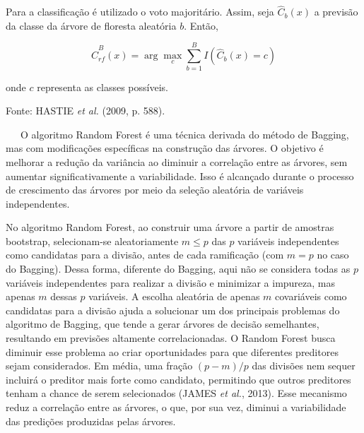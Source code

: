 \documentclass[
  12pt,
  a4paper,
]{scrreprt}
\begin{document}
\begin{algo}
{\begin{algorithm}[H]
\begin{algorithmic}
\vspace{1em}

\State \hspace{0.7em} Para a classificação é utilizado o voto majoritário. Assim, seja $\hat{C}_{b}\left(x\right)$ a previsão da classe da árvore de floresta aleatória $b$. Então,

$$
\hat{C}^{B}_{rf}\left(x\right) = \arg \max_c \sum^{B}_{b = 1}I\left(\hat{C}_b\left(x\right) = c\right)
$$

\State onde $c$ representa as classes possíveis.

\end{algorithmic}
\end{algorithm}

}

\caption{\label{algo-rf}Fonte: HASTIE \emph{et al.} (2009, p. 588).}

\end{algo}%

~~~O algoritmo Random Forest é uma técnica derivada do método de
Bagging, mas com modificações específicas na construção das árvores. O
objetivo é melhorar a redução da variância ao diminuir a correlação
entre as árvores, sem aumentar significativamente a variabilidade. Isso
é alcançado durante o processo de crescimento das árvores por meio da
seleção aleatória de variáveis independentes.

\vspace{12pt}

No algoritmo Random Forest, ao construir uma árvore a partir de amostras
bootstrap, selecionam-se aleatoriamente \(m \leq p\) das \(p\) variáveis
independentes como candidatas para a divisão, antes de cada ramificação
(com \(m = p\) no caso do Bagging). Dessa forma, diferente do Bagging,
aqui não se considera todas as \(p\) variáveis independentes para
realizar a divisão e minimizar a impureza, mas apenas \(m\) dessas \(p\)
variáveis. A escolha aleatória de apenas \(m\) covariáveis como
candidatas para a divisão ajuda a solucionar um dos principais problemas
do algoritmo de Bagging, que tende a gerar árvores de decisão
semelhantes, resultando em previsões altamente correlacionadas. O Random
Forest busca diminuir esse problema ao criar oportunidades para que
diferentes preditores sejam considerados. Em média, uma fração
\((p -m)/ p\) das divisões nem sequer incluirá o preditor mais forte
como candidato, permitindo que outros preditores tenham a chance de
serem selecionados (JAMES \emph{et al.}, 2013). Esse mecanismo reduz a
correlação entre as árvores, o que, por sua vez, diminui a variabilidade
das predições produzidas pelas árvores.
\end{document}
